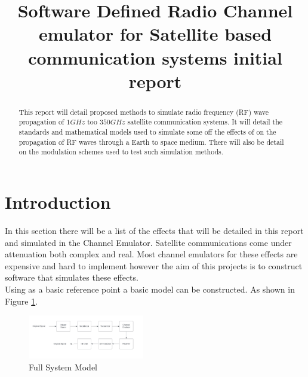 \documentclass[conference]{IEEEtran}
\begin{document}
\title{Software Defined Radio Channel emulator for Satellite based communication systems initial report}

\author{
}

\maketitle

\begin{abstract}
This report will detail proposed methods to simulate radio frequency (RF) wave propagation of $1G Hz$ too $350G Hz$ satellite communication systems. It will detail the standards and mathematical models used to simulate some off the effects of on the propagation of RF waves through a Earth to space medium. There will also be detail on the modulation schemes used to test such simulation methods.
\end{abstract}

\section{Introduction}
In this section there will be a list of the effects that will be detailed in this report and simulated in the Channel Emulator. Satellite communications come under attenuation both complex and real. Most channel emulators for these effects are expensive and hard to implement however the aim of this projects is to construct software that simulates these effects.\\

Using \cite{seybold_introduction_2005} as a basic reference point a basic model can be constructed. As shown in Figure \ref{fig:System_model}. 
\begin{figure}[h]
\centering
	\includegraphics[width = 0.45\textwidth]{System_model.png}
	\caption{Full System Model}
	\label{fig:System_model}
\end{figure}
\end{document}
